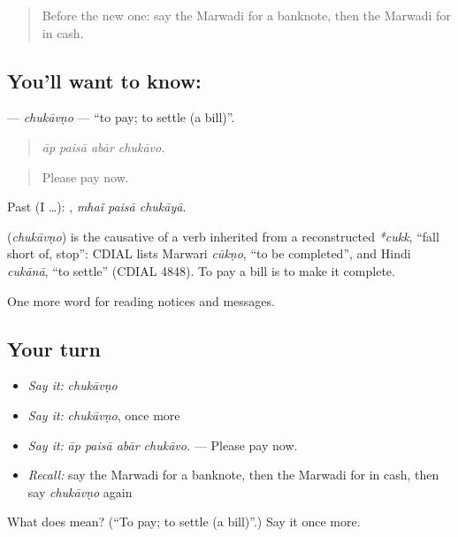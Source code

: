 \label{lesson:MW-C193-chukavno}



\begin{quote}
Before the new one: say the Marwadi for a banknote, then the Marwadi for in cash.
\end{quote}

\subsection*{You'll want to know: }
\textbf{} — \emph{chukāvṇo} — \textquotedblleft{}to pay; to settle (a bill)\textquotedblright{}.

\begin{quote}
   
\end{quote}

\begin{quote}
\emph{āp paisā abār chukāvo.}
\end{quote}

\begin{quote}
Please pay now.
\end{quote}

Past (I …):   , \emph{mhaĩ paisā chukāyā}.

\begin{cousinweb}
\textbf{} (\emph{chukāvṇo}) is the causative of a verb inherited from a reconstructed \emph{*cukk}, \textquotedblleft{}fall short of, stop\textquotedblright{}: CDIAL lists Marwari \emph{cūkṇo}, \textquotedblleft{}to be completed\textquotedblright{}, and Hindi \emph{cukānā}, \textquotedblleft{}to settle\textquotedblright{} (CDIAL 4848). To pay a bill is to make it complete.
\end{cousinweb}

\begin{grammarlens}[title={What you've built}]
One more word for reading notices and messages.
\end{grammarlens}

\subsection*{Your turn}
\begin{itemize}
\raggedright
  \item \emph{Say it:} \emph{chukāvṇo}
  \item \emph{Say it:} \emph{chukāvṇo}, once more
  \item \emph{Say it:} \emph{āp paisā abār chukāvo.} — Please pay now.
  \item \emph{Recall:} say the Marwadi for a banknote, then the Marwadi for in cash, then say \emph{chukāvṇo} again
\end{itemize}

\begin{tcolorbox}[breakable,colback=teal!4,colframe=teal!35!black,title={Before you move on}]
What does  mean? (\textquotedblleft{}To pay; to settle (a bill)\textquotedblright{}.) Say it once more.
\end{tcolorbox}
